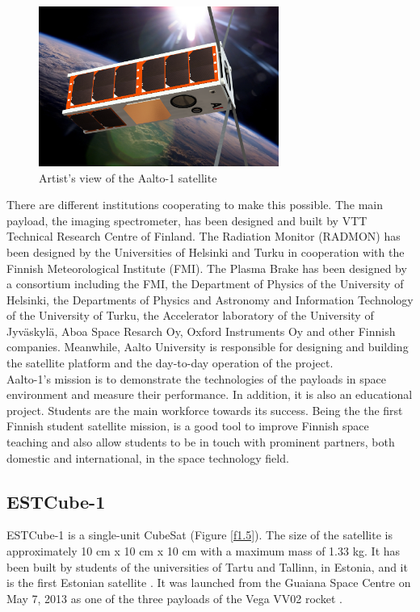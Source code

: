 \begin{figure}[H]
\centerline{\includegraphics[width=0.7\textwidth]{images/aalto1.png}}
\caption{Artist's view of the Aalto-1 satellite}
\label{f1.4}
\end{figure}


There are different institutions cooperating to make this possible. The main payload, the imaging spectrometer, has been designed and built by VTT Technical Research Centre of Finland. The Radiation Monitor (RADMON) has been designed by the Universities of Helsinki and Turku in cooperation with the Finnish Meteorological Institute (FMI). The Plasma Brake has been designed by a consortium including the FMI, the Department of Physics of the University of Helsinki, the Departments of Physics and Astronomy and Information Technology of the University of Turku, the Accelerator laboratory of the University of Jyväskylä, Aboa Space Resarch Oy, Oxford Instruments Oy and other Finnish companies. Meanwhile, Aalto University is responsible for designing and building the satellite platform and the day-to-day operation of the project. \cite{AALTO1b}\\ 

Aalto-1's mission is to demonstrate the technologies of the payloads in space environment and measure their performance. In addition, it is also an educational project. Students are the main workforce towards its success. Being the the first Finnish student satellite mission, is a good tool to improve Finnish space teaching and also allow students to be in touch with prominent partners, both domestic and international, in the space technology field.


\subsection{ESTCube-1}

ESTCube-1 is a single-unit CubeSat (Figure \ref{f1.5}). The size of the satellite is approximately 10 cm x 10 cm x 10 cm with a maximum mass of 1.33 kg. It has been built by students of the universities of Tartu and Tallinn, in Estonia, and it is the first Estonian satellite \cite{ESTCube}.
It was launched from the Guaiana Space Centre on May 7, 2013 as one of the three payloads of the Vega VV02 rocket \cite{Arianespace}.\\


